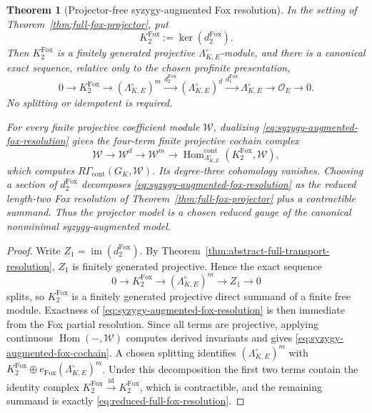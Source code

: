 \documentclass[11pt]{article}
\newtheorem{theorem}{Theorem}[section]
\theoremstyle{definition}
\begin{document}
\begin{theorem}[Projector-free syzygy-augmented Fox resolution]\label{thm:syzygy-augmented-fox}
In the setting of Theorem~\ref{thm:full-fox-projector}, put
\[
 K_2^{\mathrm{Fox}}:=\ker(d_2^{\mathrm{Fox}}).
\]
Then $K_2^{\mathrm{Fox}}$ is a finitely generated projective
$\Lambda_{K,E}^{\circ}$-module, and there is a canonical exact sequence,
relative only to the chosen profinite presentation,
\begin{equation}\label{eq:syzygy-augmented-fox-resolution}
0\longrightarrow K_2^{\mathrm{Fox}}
\longrightarrow(\Lambda_{K,E}^{\circ})^m
\xrightarrow{d_2^{\mathrm{Fox}}}
(\Lambda_{K,E}^{\circ})^d
\xrightarrow{d_1^{\mathrm{Fox}}}
\Lambda_{K,E}^{\circ}
\longrightarrow\mathcal O_E\longrightarrow0.
\end{equation}
No splitting or idempotent is required.

For every finite projective coefficient module $\mathcal W$, dualizing
\eqref{eq:syzygy-augmented-fox-resolution} gives the four-term finite
projective cochain complex
\begin{equation}\label{eq:syzygy-augmented-fox-cochain}
\mathcal W
\longrightarrow\mathcal W^d
\longrightarrow\mathcal W^m
\longrightarrow
\operatorname{Hom}^{\mathrm{cont}}_{\Lambda_{K,E}^{\circ}}
(K_2^{\mathrm{Fox}},\mathcal W),
\end{equation}
which computes $R\Gamma_{\mathrm{cont}}(G_K,\mathcal W)$.  Its degree-three
cohomology vanishes.  Choosing a section of $d_2^{\mathrm{Fox}}$ decomposes
\eqref{eq:syzygy-augmented-fox-resolution} as the reduced length-two Fox
resolution of Theorem~\ref{thm:full-fox-projector} plus a contractible
summand.  Thus the projector model is a chosen reduced gauge of the canonical
nonminimal syzygy-augmented model.
\end{theorem}

\begin{proof}
Write $Z_1=\operatorname{im}(d_2^{\mathrm{Fox}})$.  By
Theorem~\ref{thm:abstract-full-transport-resolution}, $Z_1$ is finitely
generated projective.  Hence the exact sequence
\[
0\longrightarrow K_2^{\mathrm{Fox}}
\longrightarrow(\Lambda_{K,E}^{\circ})^m
\longrightarrow Z_1\longrightarrow0
\]
splits, so $K_2^{\mathrm{Fox}}$ is a finitely generated projective direct
summand of a finite free module.  Exactness of
\eqref{eq:syzygy-augmented-fox-resolution} is then immediate from the Fox
partial resolution.  Since all terms are projective, applying continuous
$\operatorname{Hom}(-,\mathcal W)$ computes derived invariants and gives
\eqref{eq:syzygy-augmented-fox-cochain}.  A chosen splitting identifies
$(\Lambda_{K,E}^{\circ})^m$ with
$K_2^{\mathrm{Fox}}\oplus e_{\mathrm{Fox}}(\Lambda_{K,E}^{\circ})^m$.
Under this decomposition the first two terms contain the identity complex
$K_2^{\mathrm{Fox}}\xrightarrow{\mathrm{id}}K_2^{\mathrm{Fox}}$, which is
contractible, and the remaining summand is exactly
\eqref{eq:reduced-full-fox-resolution}.
\end{proof}
\end{document}
